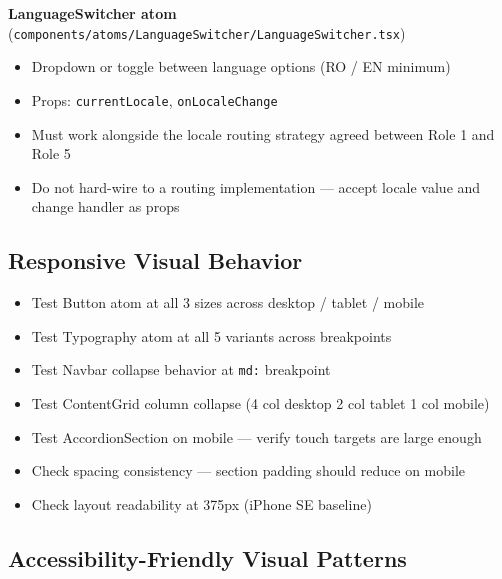 \documentclass[12pt,a4paper]{article}
\begin{document}
\vspace{0.8em}
\noindent\textbf{LanguageSwitcher atom}\\
(\texttt{components/atoms/LanguageSwitcher/LanguageSwitcher.tsx})

\begin{itemize}
    \item[$\square$] Dropdown or toggle between language options (RO / EN minimum)
    \item[$\square$] Props: \texttt{currentLocale}, \texttt{onLocaleChange}
    \item[$\square$] Must work alongside the locale routing strategy agreed between Role 1 and Role 5
    \item[$\square$] Do not hard-wire to a routing implementation --- accept locale value and change handler as props
\end{itemize}

\subsection{Responsive Visual Behavior}

\begin{itemize}
    \item[$\square$] Test Button atom at all 3 sizes across desktop / tablet / mobile
    \item[$\square$] Test Typography atom at all 5 variants across breakpoints
    \item[$\square$] Test Navbar collapse behavior at \texttt{md:} breakpoint
    \item[$\square$] Test ContentGrid column collapse (4 col desktop \textrightarrow{} 2 col tablet \textrightarrow{} 1 col mobile)
    \item[$\square$] Test AccordionSection on mobile --- verify touch targets are large enough
    \item[$\square$] Check spacing consistency --- section padding should reduce on mobile
    \item[$\square$] Check layout readability at 375px (iPhone SE baseline)
\end{itemize}

\subsection{Accessibility-Friendly Visual Patterns}
\end{document}
